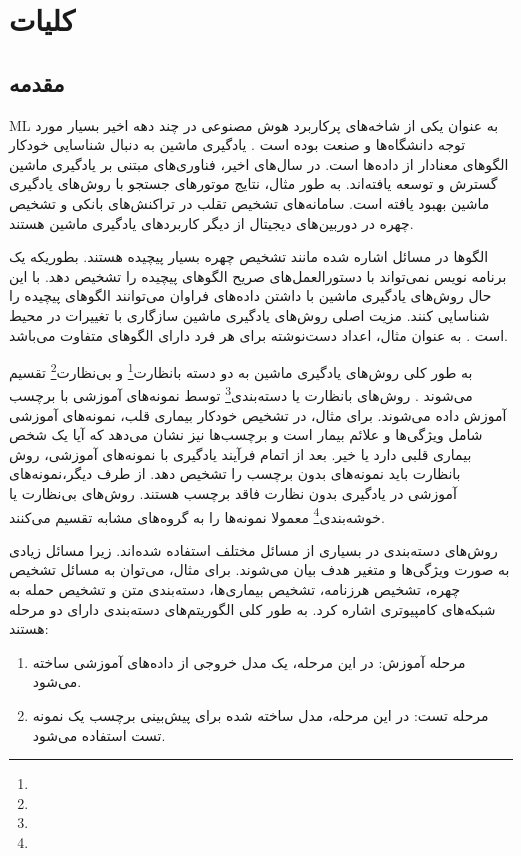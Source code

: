 \chapter{کلیات} \label{ch:1}
\section{مقدمه} \label{sec:1:1}
\gls*{ML} به عنوان یکی از شاخه‌های پرکاربرد هوش مصنوعی در چند دهه اخیر بسیار مورد توجه دانشگاه‌ها و صنعت بوده است \cite{jordan2015}. یادگیری ماشین به دنبال شناسایی خودکار الگوهای معنادار از داده‌ها است. در سال‌های اخیر، فناوری‌های مبتنی بر یادگیری ماشین گسترش و توسعه یافته‌اند. به طور مثال، نتایج موتورهای جستجو با روش‌های یادگیری ماشین بهبود یافته است. سامانه‌های تشخیص تقلب در تراکنش‌های بانکی و تشخیص چهره در دوربین‌های دیجیتال از دیگر کاربردهای یادگیری ماشین هستند.

الگوها در مسائل اشاره شده مانند تشخیص چهره بسیار پیچیده هستند. بطوریکه یک برنامه نویس نمی‌تواند با دستورالعمل‌های صریح الگوهای پیچیده را تشخیص دهد. با این حال روش‌های یادگیری ماشین با داشتن داده‌های فراوان می‌توانند الگوهای پیچیده را شناسایی کنند. مزیت اصلی روش‌های یادگیری ماشین سازگاری با تغییرات در محیط است \cite{shalev2014}. به عنوان مثال، اعداد دست‌نوشته برای هر فرد دارای الگوهای متفاوت می‌باشد.

به طور کلی روش‌های یادگیری ماشین به دو دسته بانظارت\footnote{} و بی‌نظارت\footnote{} تقسیم می‌شوند \cite{shalev2014}. روش‌های بانظارت یا دسته‌بندی\footnote{} توسط نمونه‌های آموزشی با برچسب آموزش داده می‌شوند. برای مثال، در تشخیص خودکار بیماری قلب، نمونه‌های آموزشی شامل ویژگی‌ها و علائم بیمار است و برچسب‌ها نیز نشان می‌دهد که آیا یک شخص بیماری قلبی دارد یا خیر. بعد از اتمام فرآیند یادگیری با نمونه‌های آموزشی، روش بانظارت باید نمونه‌های بدون برچسب را تشخیص دهد. از طرف دیگر،نمونه‌های آموزشی در یادگیری بدون نظارت فاقد برچسب هستند. روش‌های بی‌نظارت یا خوشه‌بندی\footnote{} معمولا نمونه‌ها را به گروه‌های مشابه تقسیم می‌کنند.

روش‌های دسته‌بندی در بسیاری از مسائل مختلف استفاده شده‌اند. زیرا مسائل زیادی به صورت ویژگی‌ها و متغیر هدف بیان می‌شوند. برای مثال، می‌توان به مسائل تشخیص چهره، تشخیص هرزنامه، تشخیص بیماری‌ها، دسته‌بندی متن و تشخیص حمله به شبکه‌های کامپیوتری اشاره کرد.   به طور کلی الگوریتم‌های دسته‌بندی دارای دو مرحله هستند:
\begin{enumerate}
	\item مرحله آموزش: در این مرحله، یک مدل خروجی از داده‌های آموزشی ساخته می‌شود.
	\item مرحله تست: در این مرحله، مدل ساخته شده برای پیش‌بینی برچسب یک نمونه تست استفاده می‌شود.
\end{enumerate}

